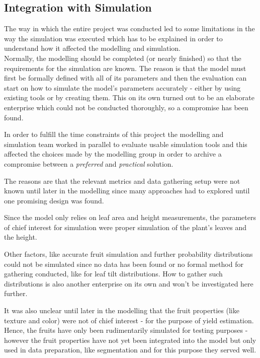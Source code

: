 \graphicspath{{members/ssr/figures/}}

\subsection{Integration with Simulation}\label{subsec:integration-with-simulation}


The way in which the entire project was conducted led to some limitations in the way the simulation was executed
which has to be explained in order to understand how it affected the modelling and simulation.\\

Normally, the modelling should be completed (or nearly finished) so that the requirements for the simulation are known.
The reason is that the model must first be formally defined with all of its parameters and then the evaluation can start
on how to simulate the model's parameters accurately - either by using existing tools or by creating them. 
This on its own turned out to be an elaborate enterprise which could not be conducted thoroughly, so a
compromise has been found.

In order to fulfill the time constraints of this project the modelling and simulation team worked in parallel
to evaluate usable simulation tools and this affected the choices made by the modelling group in order
to archive a compromise between a \textit{preferred} and \textit{practical} solution.

The reasons are that the relevant metrics and data gathering setup were not known until later in the modelling
since many approaches had to explored until one promising design was found.

Since the model only relies on leaf area and height measurements, the parameters of chief interest for simulation
were proper simulation of the plant's leaves and the height.

Other factors, like accurate fruit simulation and further probability distributions could not be simulated
since no data has been found or no formal method for gathering conducted, like for leaf tilt distributions.
How to gather such distributions is also another enterprise on its own and won't be investigated here
further.

It was also unclear until later in the modelling that the fruit properties (like texture and color)
were not of chief interest - for the purpose of yield estimation.
Hence, the fruits have only been rudimentarily simulated for testing purposes
- however the fruit properties have not yet been integrated into the model but only used in
data preparation, like segmentation and for this purpose they served well.\\

